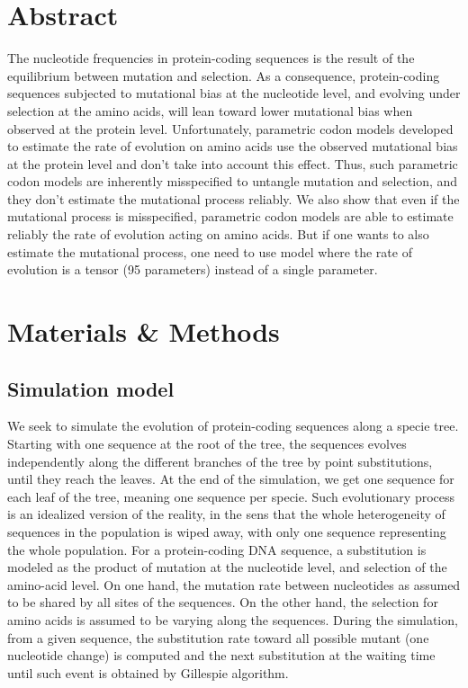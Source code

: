 \section{Abstract}

The nucleotide frequencies in protein-coding sequences is the result of the equilibrium between mutation and selection.
As a consequence, protein-coding sequences subjected to mutational bias at the nucleotide level, and evolving under selection at the amino acids, will lean toward lower mutational bias when observed at the protein level.
Unfortunately, parametric \gls{codon} models developed to estimate the rate of evolution on amino acids use the observed mutational bias at the protein level and don't take into account this effect.
Thus, such parametric \gls{codon} models are inherently misspecified to untangle mutation and selection, and they don’t estimate the mutational process reliably.
We also show that even if the mutational process is misspecified, parametric \gls{codon} models are able to estimate reliably the rate of evolution acting on amino acids.
But if one wants to also estimate the mutational process, one need to use model where the rate of evolution is a tensor (95 parameters) instead of a single parameter.


\section{Materials \& Methods}

\subsection{Simulation model}
\label{sec-mut-bias:simu}
We seek to simulate the evolution of protein-coding sequences along a specie tree.
Starting with one sequence at the root of the tree, the sequences evolves independently along the different branches of the tree by point \glspl{substitution}, until they reach the leaves.
At the end of the simulation, we get one sequence for each leaf of the tree, meaning one sequence per specie.
Such evolutionary process is an idealized version of the reality, in the sens that the whole heterogeneity of sequences in the population is wiped away, with only one sequence representing the whole population.
For a protein-coding \acrshort{DNA} sequence, a \gls{substitution} is modeled as the product of mutation at the nucleotide level, and selection of the amino-acid level.
On one hand, the mutation rate between nucleotides as assumed to be shared by all sites of the sequences.
On the other hand, the selection for amino acids is assumed to be varying along the sequences.
During the simulation, from a given sequence, the \gls{substitution} rate toward all possible mutant (one nucleotide change) is computed and the next \gls{substitution} at the waiting time until such event is obtained by Gillespie algorithm.

